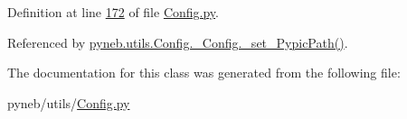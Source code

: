 Definition at line \hyperlink{_config_8py_source_l00172}{172} of file \hyperlink{_config_8py_source}{Config.\-py}.



Referenced by \hyperlink{_config_8py_source_l00168}{pyneb.\-utils.\-Config.\-\_\-\-Config.\-\_\-set\-\_\-\-Pypic\-Path()}.



The documentation for this class was generated from the following file\-:\begin{DoxyCompactItemize}
\item 
pyneb/utils/\hyperlink{_config_8py}{Config.\-py}\end{DoxyCompactItemize}
